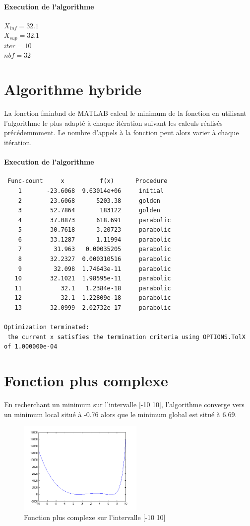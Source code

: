 \documentclass[twocolumn,10pt,a4paper]{article}
\begin{document}
\paragraph{Execution de l'algorithme}
$X_{inf}= 32.1$\\
$X_{sup}=32.1$\\
$iter=10$\\
$nbf=32$

\section{Algorithme hybride}
La fonction fminbnd de MATLAB calcul le minimum de la fonction en utilisant l'algorithme le plus adapté à chaque itération suivant les calculs réalisés précédemmment. Le nombre d'appels à la fonction peut alors varier à chaque itération.
\paragraph{Execution de l'algorithme}
\begin{lstlisting} 
 Func-count     x          f(x)      Procedure
    1       -23.6068  9.63014e+06     initial
    2        23.6068      5203.38     golden
    3        52.7864       183122     golden
    4        37.0873      618.691     parabolic
    5        30.7618      3.20723     parabolic
    6        33.1287      1.11994     parabolic
    7         31.963   0.00035205     parabolic
    8        32.2327  0.000310516     parabolic
    9         32.098  1.74643e-11     parabolic
   10        32.1021  1.98595e-11     parabolic
   11           32.1   1.2384e-18     parabolic
   12           32.1  1.22809e-18     parabolic
   13        32.0999  2.02732e-17     parabolic
 
Optimization terminated:
 the current x satisfies the termination criteria using OPTIONS.TolX of 1.000000e-04 

\end{lstlisting}
\section{Fonction plus complexe}
En recherchant un minimum sur l'intervalle [-10 10], l'algorithme converge vers un minimum local situé à -0.76 alors que le minimum global est situé à 6.69.

\begin{figure}[!h]
\centering
\includegraphics[width=6cm]{courbe3} 
\caption{Fonction plus complexe sur l'intervalle [-10 10]}
\end{figure}
\end{document}
